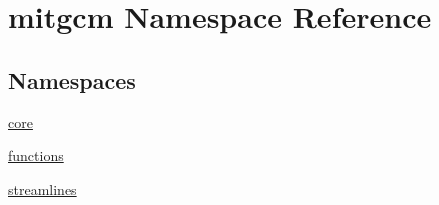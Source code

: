\hypertarget{namespacemitgcm}{}\section{mitgcm Namespace Reference}
\label{namespacemitgcm}
\subsection*{Namespaces}
\begin{DoxyCompactItemize}
\item 
 \hyperlink{namespacemitgcm_1_1core}{core}
\item 
 \hyperlink{namespacemitgcm_1_1functions}{functions}
\item 
 \hyperlink{namespacemitgcm_1_1streamlines}{streamlines}
\end{DoxyCompactItemize}
